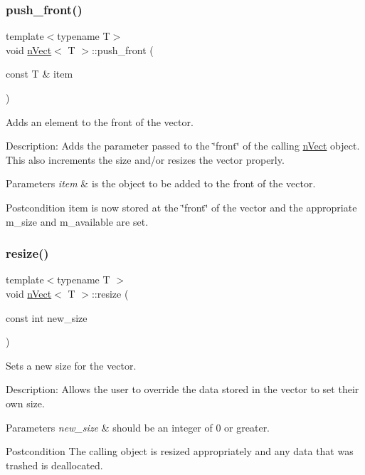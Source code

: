 \subsubsection{\texorpdfstring{push\+\_\+front()}{push\_front()}}
{\footnotesize\ttfamily template$<$typename T$>$ \\
void \hyperlink{classnVect}{n\+Vect}$<$ T $>$\+::push\+\_\+front (\begin{DoxyParamCaption}\item[{const T \&}]{item }\end{DoxyParamCaption})}



Adds an element to the front of the vector. 

Description\+: Adds the parameter passed to the \char`\"{}front\char`\"{} of the calling \hyperlink{classnVect}{n\+Vect} object. This also increments the size and/or resizes the vector properly. 
\begin{DoxyParams}{Parameters}
{\em item} & is the object to be added to the front of the vector. \\
\hline
\end{DoxyParams}
\begin{DoxyPostcond}{Postcondition}
item is now stored at the \char`\"{}front\char`\"{} of the vector and the appropriate m\+\_\+size and m\+\_\+available are set. 
\end{DoxyPostcond}
\mbox{\label{classnVect_a5d998eac73178b38c0e24a6aa29eacbb}} 
\subsubsection{\texorpdfstring{resize()}{resize()}\hspace{0.1cm}{\footnotesize\ttfamily [1/2]}}
{\footnotesize\ttfamily template$<$typename T $>$ \\
void \hyperlink{classnVect}{n\+Vect}$<$ T $>$\+::resize (\begin{DoxyParamCaption}\item[{const int}]{new\+\_\+size }\end{DoxyParamCaption})}



Sets a new size for the vector. 

Description\+: Allows the user to override the data stored in the vector to set their own size. 
\begin{DoxyParams}{Parameters}
{\em new\+\_\+size} & should be an integer of 0 or greater. \\
\hline
\end{DoxyParams}
\begin{DoxyPostcond}{Postcondition}
The calling object is resized appropriately and any data that was trashed is deallocated. 
\end{DoxyPostcond}

